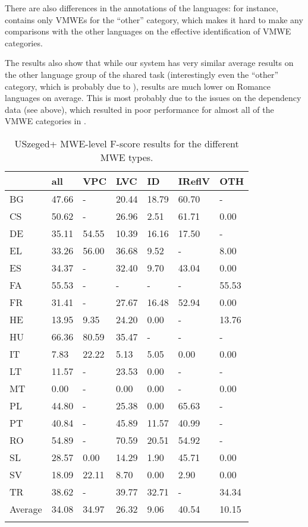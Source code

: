 \documentclass[output=paper,
modfonts,
]{langscibook}
\begin{document}
There are also differences in the annotations of the languages: for instance,  contains only VMWEs for the ``other'' category, which makes it hard to make any comparisons with the other languages on the effective identification of VMWE categories.

The results also show that while our system has very similar average results on the other language group of the shared task (interestingly even the ``other'' category, which is probably due to ), results are much lower on Romance languages on average. This is most probably due to the issues on the  dependency data (see above), which resulted in poor performance for almost all of the VMWE categories in .


\begin{table}
\centering
\caption{USzeged+ MWE-level F-score results for the different MWE types.}
\label{mwelevel}
\begin{tabular}{lllllll}
  \lsptoprule
 & all   & VPC    & LVC    & ID     & IReflV & OTH    \\
 \midrule
BG  & 47.66 &  -       & 20.44 & 18.79 & 60.70 &  -   \\
CS  & 50.62 &  -       & 26.96 & 2.51 & 61.71 & 0.00\\
DE  & 35.11 & 54.55 & 10.39 & 16.16 & 17.50 &  -   \\
EL  & 33.26 & 56.00 & 36.68 & 9.52 &  -       & 8.00\\
ES  & 34.37 &  -       & 32.40 & 9.70 & 43.04 & 0.00\\
FA  & 55.53 &  -       &  -       &  -       &  -       & 55.53 \\
FR  & 31.41 &  -       & 27.67 & 16.48 & 52.94 & 0.00\\
HE  & 13.95 & 9.35 & 24.20 & 0.00 &  -       & 13.76 \\
HU  & 66.36 & 80.59 & 35.47 &  -       &  -       &  -   \\
IT  & 7.83 & 22.22 & 5.13 & 5.05 & 0.00 & 0.00\\
LT  & 11.57 &  -       & 23.53 & 0.00 &  -       &  -   \\
MT  & 0.00 &  -       & 0.00 & 0.00 &  -       & 0.00\\
PL  & 44.80 &  -       & 25.38 & 0.00 & 65.63 &  -   \\
PT  & 40.84 &  -       & 45.89 & 11.57 & 40.99 &  -   \\
RO  & 54.89 &  -       & 70.59 & 20.51 & 54.92 &  -   \\
SL  & 28.57 & 0.00 & 14.29 & 1.90 & 45.71 & 0.00\\
SV  & 18.09 & 22.11 & 8.70 & 0.00 & 2.90 & 0.00\\
TR  & 38.62 &  -       & 39.77 & 32.71 &  -       & 34.34 \\
 \midrule
Average  & 34.08 & 34.97 & 26.32 & 9.06 & 40.54 & 10.15 \\


  \lspbottomrule
\end{tabular}
\end{table}
\end{document}
